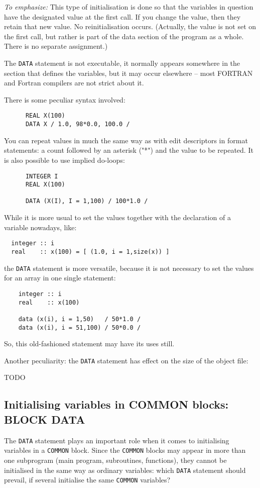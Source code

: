 \emph{To emphasize:} This type of initialisation is done so that the variables
in question have the designated value at the first call. If you change
the value, then they retain that new value. No reinitialisation occurs.
(Actually, the value is not set on the first call, but rather is part
of the data section of the program as a whole. There is no separate
assignment.)

The \verb+DATA+ statement is not executable, it normally appears
somewhere in the section that defines the variables, but it may occur
elsewhere -- most FORTRAN and Fortran compilers are not strict about it.

There is some peculiar syntax involved:
%
\begin{verbatim}
      REAL X(100)
      DATA X / 1.0, 98*0.0, 100.0 /
\end{verbatim}

You can repeat values in much the same way as with edit descriptors
in format statements: a count followed by an asterisk ("*") and the value
to be repeated. It is also possible to use implied do-loops:
%
\begin{verbatim}
      INTEGER I
      REAL X(100)

      DATA (X(I), I = 1,100) / 100*1.0 /
\end{verbatim}

While it is more usual to set the values together with the declaration
of a variable nowadays, like:
%
\begin{verbatim}
  integer :: i
  real    :: x(100) = [ (1.0, i = 1,size(x)) ]
\end{verbatim}
\noindent the \verb+DATA+ statement is more versatile, because it is
not necessary to set the values for an array in one single statement:
%
\begin{verbatim}
    integer :: i
    real    :: x(100)

    data (x(i), i = 1,50)   / 50*1.0 /
    data (x(i), i = 51,100) / 50*0.0 /
\end{verbatim}

So, this old-fashioned statement may have its uses still.

Another peculiarity: the \verb+DATA+ statement has effect on the
size of the object file:

TODO


\subsection{Initialising variables in COMMON blocks: BLOCK DATA}
The \verb+DATA+ statement plays an important role when it comes to initialising
variables in a \verb+COMMON+ block. Since the \verb+COMMON+ blocks may
appear in more than one subprogram (main program, subroutines, functions),
they cannot be initialised in the same way as ordinary variables: which
\verb+DATA+ statement should prevail, if several initialise the same
\verb+COMMON+ variables?

